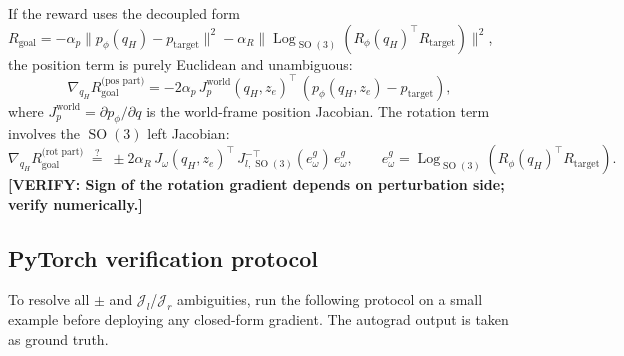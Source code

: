 \documentclass[11pt,a4paper]{article}
\DeclareMathOperator{\Log}{Log}
\DeclareMathOperator{\SO}{SO}
\newcommand{\verifyflag}[1]{\textbf{\color{red}[VERIFY: #1]}}
\begin{document}
If the reward uses the decoupled form $R_{\text{goal}} = -\alpha_p \| p_\phi(q_H) - p_{\text{target}} \|^2 - \alpha_R \| \Log_{\SO(3)}(R_\phi(q_H)^\top R_{\text{target}}) \|^2$, the position term is purely Euclidean and unambiguous:
\begin{equation}
\nabla_{q_H} R_{\text{goal}}^{\text{(pos part)}} = -2 \alpha_p \, J_p^{\text{world}}(q_H, z_e)^\top \, (p_\phi(q_H, z_e) - p_{\text{target}}),
\end{equation}
where $J_p^{\text{world}} = \partial p_\phi / \partial q$ is the world-frame position Jacobian. The rotation term involves the $\SO(3)$ left Jacobian:
\begin{equation}
\nabla_{q_H} R_{\text{goal}}^{\text{(rot part)}} \;\overset{?}{=}\; \pm 2 \alpha_R \, J_\omega(q_H, z_e)^\top \, J_{l, \SO(3)}^{-\top}(e_\omega^g) \, e_\omega^g, \qquad e_\omega^g = \Log_{\SO(3)}(R_\phi(q_H)^\top R_{\text{target}}).
\end{equation}
\verifyflag{Sign of the rotation gradient depends on perturbation side; verify numerically.}

\subsection{PyTorch verification protocol}
\label{app:verify}

To resolve all $\pm$ and $\mathcal{J}_l$/$\mathcal{J}_r$ ambiguities, run the following protocol on a small example before deploying any closed-form gradient. The autograd output is taken as ground truth.
\end{document}
